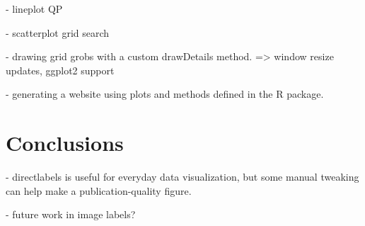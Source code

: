 \documentclass{beamer}
\begin{document}
- lineplot QP

- scatterplot grid search

- drawing grid grobs with a custom drawDetails method. => window
resize updates, ggplot2 support

- generating a website using plots and methods defined in the R
package.

\section{Conclusions}

- directlabels is useful for everyday data visualization, but some
manual tweaking can help make a publication-quality figure.

- future work in image labels?
\end{document}
